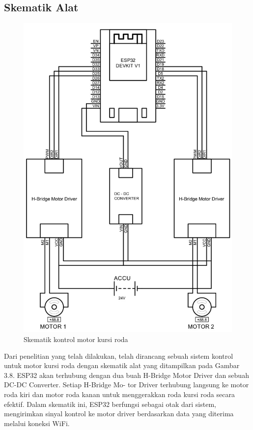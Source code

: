 \newpage
\subsection{Skematik Alat}
\begin{figure} [H] \centering
  \includegraphics[scale=0.4]{gambar/skematik alat.jpg}
  \caption{Skematik kontrol motor kursi roda\cite{ekatama2024perancangan}}
  \label{fig:skematik kontrol}
\end{figure}

Dari penelitian yang telah dilakukan, telah dirancang sebuah sistem kontrol untuk motor
kursi roda dengan skematik alat yang ditampilkan pada Gambar 3.8. ESP32 akan terhubung
dengan dua buah H-Bridge Motor Driver dan sebuah DC-DC Converter. Setiap H-Bridge Mo-
tor Driver terhubung langsung ke motor roda kiri dan motor roda kanan untuk menggerakkan
roda kursi roda secara efektif. Dalam skematik ini, ESP32 berfungsi sebagai otak dari sistem, mengirimkan sinyal kontrol ke motor driver berdasarkan data yang diterima melalui koneksi WiFi\cite{ekatama2024perancangan}.

